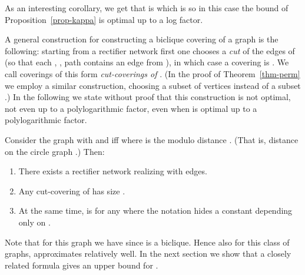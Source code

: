 \documentclass[submission]{llncs}
\begin{document}
  As an interesting corollary, we get that  is  which is 
so in this case the bound of Proposition~\ref{prop-kappa} is optimal up to a log factor.

  A general construction for constructing
  a biclique covering of a graph  is the following: starting from a rectifier network 
  first one chooses a \emph{cut}  of the edges of  (so that each , ,  path contains an edge
  from ), in which case a covering is .
  We call coverings of this form \emph{cut-coverings of }.
  (In the proof of Theorem~\ref{thm-perm} we employ a similar construction, choosing a subset  of vertices instead of a subset .)
  In the following we state without proof that this
  construction is not optimal, not even up to a polylogarithmic factor, even when  is optimal up to a polylogarithmic factor.
  \begin{theorem}
  \label{thm-negyed}
  Consider the graph  with  and  iff  where 
  is the modulo  distance . (That is, distance on the circle graph .) Then:
  \begin{enumerate}
  \item There exists a rectifier network  realizing  with  edges.
  \item Any cut-covering of  has size .
  \item At the same time,  is  for any  where the  notation hides a constant depending only on .
  \end{enumerate}
  \end{theorem}
Note that for this graph we have  since  is a biclique.
  Hence also for this class of graphs,  approximates  relatively well.
In the next section we show that a closely related formula gives an upper bound for .
\end{document}
